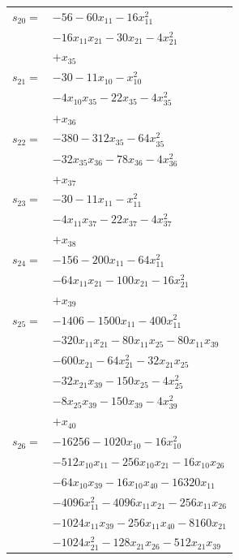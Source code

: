 \begin{longtable}{@{}r@{\;}l@{}}
\(s_{20}=\) & \(\displaystyle -56 -60x_{11} -16x_{11}^{2}\) \\
 & \(\displaystyle -16x_{11}x_{21} -30x_{21} -4x_{21}^{2}\) \\
 & \(\displaystyle +x_{35}\) \\[3pt]
\(s_{21}=\) & \(\displaystyle -30 -11x_{10} -x_{10}^{2}\) \\
 & \(\displaystyle -4x_{10}x_{35} -22x_{35} -4x_{35}^{2}\) \\
 & \(\displaystyle +x_{36}\) \\[3pt]
\(s_{22}=\) & \(\displaystyle -380 -312x_{35} -64x_{35}^{2}\) \\
 & \(\displaystyle -32x_{35}x_{36} -78x_{36} -4x_{36}^{2}\) \\
 & \(\displaystyle +x_{37}\) \\[3pt]
\(s_{23}=\) & \(\displaystyle -30 -11x_{11} -x_{11}^{2}\) \\
 & \(\displaystyle -4x_{11}x_{37} -22x_{37} -4x_{37}^{2}\) \\
 & \(\displaystyle +x_{38}\) \\[3pt]
\(s_{24}=\) & \(\displaystyle -156 -200x_{11} -64x_{11}^{2}\) \\
 & \(\displaystyle -64x_{11}x_{21} -100x_{21} -16x_{21}^{2}\) \\
 & \(\displaystyle +x_{39}\) \\[3pt]
\(s_{25}=\) & \(\displaystyle -1406 -1500x_{11} -400x_{11}^{2}\) \\
 & \(\displaystyle -320x_{11}x_{21} -80x_{11}x_{25} -80x_{11}x_{39}\) \\
 & \(\displaystyle -600x_{21} -64x_{21}^{2} -32x_{21}x_{25}\) \\
 & \(\displaystyle -32x_{21}x_{39} -150x_{25} -4x_{25}^{2}\) \\
 & \(\displaystyle -8x_{25}x_{39} -150x_{39} -4x_{39}^{2}\) \\
 & \(\displaystyle +x_{40}\) \\[3pt]
\(s_{26}=\) & \(\displaystyle -16256 -1020x_{10} -16x_{10}^{2}\) \\
 & \(\displaystyle -512x_{10}x_{11} -256x_{10}x_{21} -16x_{10}x_{26}\) \\
 & \(\displaystyle -64x_{10}x_{39} -16x_{10}x_{40} -16320x_{11}\) \\
 & \(\displaystyle -4096x_{11}^{2} -4096x_{11}x_{21} -256x_{11}x_{26}\) \\
 & \(\displaystyle -1024x_{11}x_{39} -256x_{11}x_{40} -8160x_{21}\) \\
 & \(\displaystyle -1024x_{21}^{2} -128x_{21}x_{26} -512x_{21}x_{39}\) \\

\end{longtable}
